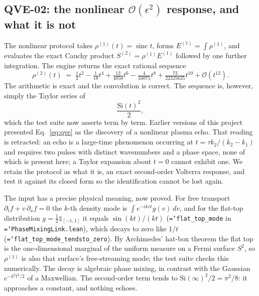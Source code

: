 \documentclass[11pt,a4paper]{article}
\newcommand{\code}[1]{\texttt{\hyphenchar\font=`\-\relax #1}}
\begin{document}
\subsection{QVE-02: the nonlinear \texorpdfstring{$\mathcal{O}(\epsilon^{2})$}{O(eps2)} response, and what it is not}
\label{sec:qve02}

The nonlinear protocol takes $\rho^{(1)}(t) = \operatorname{sinc} t$, forms
$E^{(1)} = \int \rho^{(1)}$, and evaluates the exact Cauchy product
$S^{(2)} = \rho^{(1)}E^{(1)}$ followed by one further integration. The engine
returns the exact rational sequence
\begin{equation}
  \rho^{(2)}(t) \;=\; \tfrac12 t^{2} - \tfrac1{18}t^{4} + \tfrac{13}{4050}t^{6}
  - \tfrac{4}{33075}t^{8} + \tfrac{73}{22325625}t^{10} + \mathcal{O}(t^{12}).
  \label{eq:qve}
\end{equation}
The arithmetic is exact and the convolution is correct. The sequence is,
however, simply the Taylor series of
\begin{equation}
  \frac{\mathrm{Si}(t)^{2}}{2},
\end{equation}
which the test suite now asserts term by term. Earlier versions of this project
presented Eq.~\eqref{eq:qve} as the discovery of a nonlinear plasma echo. That
reading is retracted: an echo is a large-time phenomenon occurring at
$t = \tau k_2/(k_2-k_1)$ and requires two pulses with distinct wavenumbers and
a phase space, none of which is present here; a Taylor expansion about $t=0$
cannot exhibit one. We retain the protocol as what it is, an exact
second-order Volterra response, and test it against its closed form so the
identification cannot be lost again.

The input has a precise physical meaning, now proved. For free transport
$\partial_t f+v\,\partial_x f=0$ the $k$-th density mode is
$\int e^{-ikvt}g(v)\,dv$, and for the flat-top distribution $g=\tfrac12\mathbb{1}_{[-1,1]}$ it
equals $\sin(kt)/(kt)$ (\code{flat\_top\_mode} in \code{PhaseMixingLink.lean}), which decays to
zero like $1/t$ (\code{flat\_top\_mode\_tendsto\_zero}). By Archimedes' hat-box theorem the flat
top is the one-dimensional marginal of the uniform measure on a Fermi surface $S^2$, so
$\rho^{(1)}$ is also that surface's free-streaming mode; the test suite checks this
numerically. The decay is algebraic phase mixing, in contrast with the Gaussian $e^{-k^2t^2/2}$ of
a Maxwellian. The second-order term tends to $\mathrm{Si}(\infty)^2/2=\pi^2/8$: it approaches a
constant, and nothing echoes.
\end{document}
